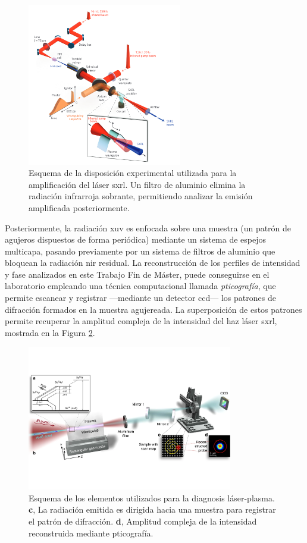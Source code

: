 \begin{figure}[htbp]
  \centering
  \includegraphics[width=0.6\textwidth]{Figuras/ch3_exper1.png}
  \caption{Esquema de la disposición experimental\autocite{Depresseux2015} utilizada para la amplificación del láser \acrshort{sxrl}. Un filtro de aluminio elimina la radiación infrarroja sobrante, permitiendo analizar la emisión amplificada posteriormente.}
  \label{fig:3.6}
\end{figure}

Posteriormente, la radiación \acrshort{xuv} es enfocada sobre una muestra (un patrón de agujeros dispuestos de forma periódica) mediante un sistema de espejos multicapa\autocite{Tuitje2020}, pasando previamente por un sistema de filtros de aluminio que bloquean la radiación \acrshort{nir} residual. La reconstrucción de los perfiles de intensidad y fase analizados en este Trabajo Fin de Máster, puede conseguirse en el laboratorio empleando una técnica computacional llamada \emph{pticografía}, que permite escanear y registrar ---mediante un detector \acrshort{ccd}--- los patrones de difracción formados en la muestra agujereada. La superposición de estos patrones permite recuperar la amplitud compleja de la intensidad del haz láser \acrshort{sxrl}, mostrada en la Figura \ref{fig:3.7}.

\begin{figure}[htbp]
  \centering
  \includegraphics[width=0.8\textwidth]{Figuras/ch3_exper2.pdf}
  \caption{Esquema de los elementos\autocite{Tuitje2020} utilizados para la diagnosis láser-plasma. \textbf{c}, La radiación emitida es dirigida hacia una muestra para registrar el patrón de difracción. \textbf{d}, Amplitud compleja de la intensidad reconstruida mediante pticografía.}
  \label{fig:3.7}
\end{figure}

